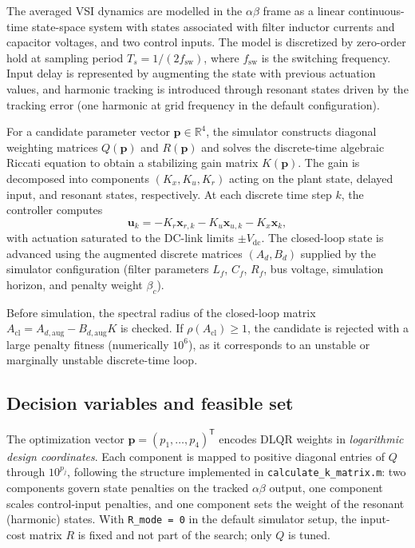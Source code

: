 \documentclass[pdflatex,sn-mathphys-num]{sn-jnl}
\begin{document}
The averaged VSI dynamics are modelled in the $\alpha\beta$ frame as a linear continuous-time state-space system with states associated with filter inductor currents and capacitor voltages, and two control inputs.
The model is discretized by zero-order hold at sampling period $T_s = 1/(2 f_{\mathrm{sw}})$, where $f_{\mathrm{sw}}$ is the switching frequency.
Input delay is represented by augmenting the state with previous actuation values, and harmonic tracking is introduced through resonant states driven by the tracking error (one harmonic at grid frequency in the default configuration).

For a candidate parameter vector $\mathbf{p} \in \mathbb{R}^4$, the simulator constructs diagonal weighting matrices $Q(\mathbf{p})$ and $R(\mathbf{p})$ and solves the discrete-time algebraic Riccati equation to obtain a stabilizing gain matrix $K(\mathbf{p})$.
The gain is decomposed into components $(K_x, K_u, K_r)$ acting on the plant state, delayed input, and resonant states, respectively.
At each discrete time step $k$, the controller computes
\begin{equation}
  \mathbf{u}_k = -K_r \mathbf{x}_{r,k} - K_u \mathbf{x}_{u,k} - K_x \mathbf{x}_k,
  \label{eq:control-law}
\end{equation}
with actuation saturated to the DC-link limits $\pm V_{\mathrm{dc}}$.
The closed-loop state is advanced using the augmented discrete matrices $(A_d, B_d)$ supplied by the simulator configuration (filter parameters $L_f$, $C_f$, $R_f$, bus voltage, simulation horizon, and penalty weight $\beta_c$).

Before simulation, the spectral radius of the closed-loop matrix $A_{\mathrm{cl}} = A_{d,\mathrm{aug}} - B_{d,\mathrm{aug}} K$ is checked.
If $\rho(A_{\mathrm{cl}}) \ge 1$, the candidate is rejected with a large penalty fitness (numerically $10^6$), as it corresponds to an unstable or marginally unstable discrete-time loop.

\subsection{Decision variables and feasible set}\label{subsec:variables}

The optimization vector $\mathbf{p} = (p_1,\ldots,p_4)^{\mathsf{T}}$ encodes DLQR weights in \emph{logarithmic design coordinates}.
Each component is mapped to positive diagonal entries of $Q$ through $10^{p_j}$, following the structure implemented in \texttt{calculate\_k\_matrix.m}:
two components govern state penalties on the tracked $\alpha\beta$ output, one component scales control-input penalties, and one component sets the weight of the resonant (harmonic) states.
With \texttt{R\_mode = 0} in the default simulator setup, the input-cost matrix $R$ is fixed and not part of the search; only $Q$ is tuned.
\end{document}
